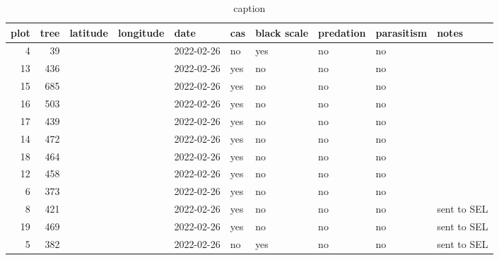 \documentclass[12pt,letterpaper,english,bibliography=totocnumbered, abstract=on]{scrartcl}
\begin{document}
\begin{table}[h]
	\centering
	\caption{caption}
	\label{leaf_samples_table}
	\begin{footnotesize}
	\begin{tabular}{rrrrllllll}
		\toprule
		plot &  tree &  latitude &  longitude &       date & cas & black scale & predation & parasitism &       notes \\
		\midrule
		4 &    39 &           &            & 2022-02-26 &  no &         yes &        no &         no &             \\
		13 &   436 &           &            & 2022-02-26 & yes &          no &        no &         no &             \\
		15 &   685 &           &            & 2022-02-26 & yes &          no &        no &         no &             \\
		16 &   503 &           &            & 2022-02-26 & yes &          no &        no &         no &             \\
		17 &   439 &           &            & 2022-02-26 & yes &          no &        no &         no &             \\
		14 &   472 &           &            & 2022-02-26 & yes &          no &        no &         no &             \\
		18 &   464 &           &            & 2022-02-26 & yes &          no &        no &         no &             \\
		12 &   458 &           &            & 2022-02-26 & yes &          no &        no &         no &             \\
		6 &   373 &           &            & 2022-02-26 & yes &          no &        no &         no &             \\
		8 &   421 &           &            & 2022-02-26 & yes &          no &        no &         no & sent to SEL \\
		19 &   469 &           &            & 2022-02-26 & yes &          no &        no &         no & sent to SEL \\
		5 &   382 &           &            & 2022-02-26 &  no &         yes &        no &         no & sent to SEL \\
		\bottomrule
	\end{tabular}
	\end{footnotesize}
\end{table}


%
%
\end{document}
